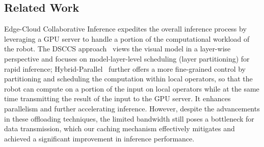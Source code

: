 \subsection{Related Work}
Edge-Cloud Collaborative Inference expedites the overall inference process by leveraging a GPU server to handle a portion of the computational workload of the robot. 
The DSCCS approach~\cite{liang2023dnn} views the visual model in a layer-wise perspective and focuses on model-layer-level scheduling (layer partitioning) for rapid inference;
Hybrid-Parallel~\cite{sun2024hybridparallel} further offers a more fine-grained control by partitioning and scheduling the computation within local operators, so that the robot can compute on a portion of the input on local operators while at the same time transmitting the result of the input to the GPU server.
It enhances parallelism and further accelerating inference. 
However, despite the advancements in these offloading techniques, the limited bandwidth still poses a bottleneck for data transmission, which our caching mechanism effectively mitigates and achieved a significant improvement in inference performance.


